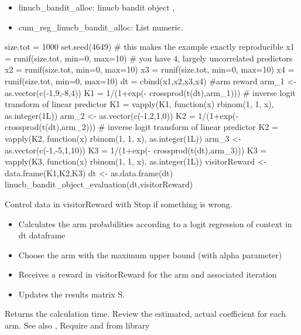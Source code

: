 \documentclass[letterpaper]{book}
\begin{document}
%
\begin{Value}
\begin{itemize}
 List of element:
\item linucb\_bandit\_alloc: linucb bandit object ,
\item cum\_reg\_linucb\_bandit\_alloc: List numeric.

\end{itemize}

\end{Value}
%
\begin{Examples}
\begin{ExampleCode}
size.tot = 1000
set.seed(4649)                          # this makes the example exactly reproducible
x1 = runif(size.tot, min=0, max=10)          # you have 4, largely uncorrelated predictors
x2 = runif(size.tot, min=0, max=10)
x3 = runif(size.tot, min=0, max=10)
x4 = runif(size.tot, min=0, max=10)
dt = cbind(x1,x2,x3,x4)
#arm reward
arm_1 <-  as.vector(c(-1,9,-8,4))
K1 = 1/(1+exp(- crossprod(t(dt),arm_1))) # inverse logit transform of linear predictor
K1 = vapply(K1, function(x) rbinom(1, 1, x), as.integer(1L))
arm_2 <-  as.vector(c(-1,2,1,0))
K2 = 1/(1+exp(- crossprod(t(dt),arm_2))) # inverse logit transform of linear predictor
K2 = vapply(K2, function(x) rbinom(1, 1, x), as.integer(1L))
arm_3 <-  as.vector(c(-1,-5,1,10))
K3 = 1/(1+exp(- crossprod(t(dt),arm_3)))
K3 = vapply(K3, function(x) rbinom(1, 1, x), as.integer(1L))
visitorReward <-  data.frame(K1,K2,K3)
dt <- as.data.frame(dt)
linucb_bandit_object_evaluation(dt,visitorReward)
\end{ExampleCode}
\end{Examples}
%
\begin{Description}\relax
Control data in visitorReward with 
Stop if something is wrong.
\begin{itemize}
 At each iteration
\item Calculates the arm probabilities according to a logit regression of context in dt dataframe
\item Choose the arm with the maximum upper bound (with alpha parameter)
\item Receives a reward in visitorReward for the arm and associated iteration
\item Updates the results matrix S.

\end{itemize}

Returns the calculation time.
Review the estimated, actual coefficient for each arm.
See also  ,
Require  and  from  library
\end{Description}
\end{document}
